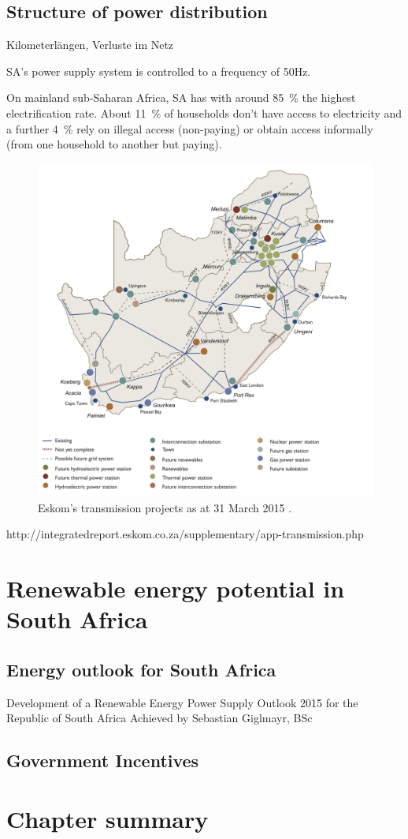 \subsection{Structure of power distribution}
Kilometerlängen, Verluste im Netz \cite{Eskom2014a}

SA's power supply system is controlled to a frequency of 50Hz.

On mainland sub-Saharan Africa, SA has with around 85~\% the highest electrification rate. About 11~\% of households don't have access to electricity and a further 4~\% rely on illegal access (non-paying) or obtain access informally (from one household to another but paying). \cite{IEA2014f}

\begin{figure}[htbp]
\centering
\includegraphics[width=1\linewidth]{FIG/transmissionprojekts}
\caption[Eskom’s transmission projects as at 31 March 2015.]{Eskom’s transmission projects as at 31 March 2015 \cite{Eskom2015a}.}\label{transmissionprojekts}
\end{figure}

http://integratedreport.eskom.co.za/supplementary/app-transmission.php

\section{Renewable energy potential in South Africa}

\subsection{Energy outlook for South Africa}
Development of a Renewable Energy Power Supply Outlook 2015 for the Republic of South Africa
Achieved by Sebastian Giglmayr, BSc
\cite{Giglmayr2013}

\subsection{Government Incentives}

\section{Chapter summary}
\pagebreak

